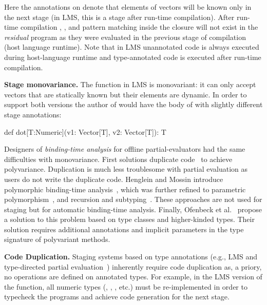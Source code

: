 Here the  annotations on  denote that elements of vectors will be known
 only in the next stage (in LMS, this is a stage after run-time compilation). After run-time compilation ,
 , and pattern matching inside the closure will not exist in the \emph{residual} program
 as they were evaluated in the previous stage of compilation (host language runtime). Note that in
 LMS unannotated code is always executed during host-language runtime
 and type-annotated code is executed after run-time compilation.

{\bf Stage monovariance.} The  function in LMS is monovariant: it can only
 accept vectors that are statically known but their elements are dynamic. In order
 to support both versions the author of  would have the body of
  with slightly different stage annotations: \begin{lstparagraph}
def dot[T:Numeric](v1: Vector[T], v2: Vector[T]): T
 \end{lstparagraph}

Designers of \emph{binding-time analysis} for offline partial-evaluators had the
same difficulties with monovariance. First solutions duplicate
code~\cite{rytz1992polyvariant} to achieve polyvariance. Duplication is  much
less troublesome with partial evaluation as users do not write the duplicate
code.  Henglein and Mossin introduce polymorphic binding-time
analysis~\cite{henglein1994polymorphic}, which was further refined to parametric
polymorphism~\cite{heldal2001binding}, and recursion and
subtyping~\cite{dussart1995polymorphic}. These approaches are not used for
staging but for automatic binding-time analysis.  Finally, Ofenbeck et
al.~\cite{ofenbeck2013spiral} propose a solution to this problem based on type
classes and higher-kinded types. Their solution requires additional annotations
and implicit parameters in the type signature of polyvariant methods.

{\bf Code Duplication.} Staging systems based on type annotations (e.g., LMS and type-directed
partial evaluation~\cite{danvy1999type}) inherently require code duplication as,
a priory, no operations are defined on  annotated types. For example,
in the LMS version of the  function, all numeric types (\ie, , , etc.)
must be re-implemented in order to typecheck the programs and achieve code generation
for the next stage.

